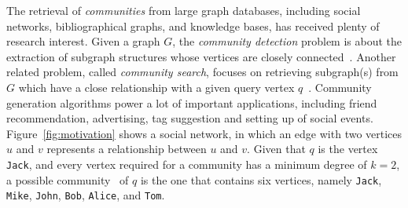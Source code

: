 %























\iffalse
The retrieval of {\it communities} from large graph databases, including social networks, bibliographical graphs, and knowledge bases, has received plenty of research interest.  Given a graph $G$, the \emph{community detection} problem is about the extraction of subgraph structures whose vertices are closely connected~\cite{community-phy2004,community-phy2010}. Another related problem, called {\it community search}, focuses on retrieving subgraph(s) from $G$ which have a close relationship with a given query vertex $q$~\cite{KDD2010,local2014,online-sigmod2013,k-truss2014}.
Community generation algorithms power a lot of important applications, including friend recommendation, advertising, tag suggestion and setting up of social events. Figure~\ref{fig:motivation} shows a social network, in which an edge with two vertices $u$ and $v$ represents a relationship between $u$ and $v$.
Given that $q$ is the vertex {\tt Jack}, and every vertex required for a community has a minimum degree of $k=2$, a possible community~\cite{KDD2010} of $q$ is the one that contains six vertices, namely {\tt Jack}, {\tt Mike}, {\tt John}, {\tt Bob}, {\tt Alice}, and {\tt Tom}.


